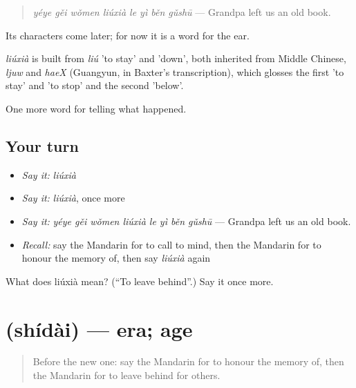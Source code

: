 \begin{quote}
\emph{yéye gěi wǒmen liúxià le yì běn gǔshū} — Grandpa left us an old book.
\end{quote}

Its characters come later; for now it is a word for the ear.

\begin{cousinweb}
\emph{liúxià} is built from \emph{liú} 'to stay' and  'down', both inherited from Middle Chinese, \emph{ljuw} and \emph{haeX} (Guangyun, in Baxter's transcription), which glosses the first 'to stay' and 'to stop' and the second 'below'.
\end{cousinweb}

\begin{grammarlens}[title={What you've built}]
One more word for telling what happened.
\end{grammarlens}

\subsection*{Your turn}
\begin{itemize}
\raggedright
  \item \emph{Say it:} \emph{liúxià}
  \item \emph{Say it:} \emph{liúxià}, once more
  \item \emph{Say it:} \emph{yéye gěi wǒmen liúxià le yì běn gǔshū} — Grandpa left us an old book.
  \item \emph{Recall:} say the Mandarin for to call to mind, then the Mandarin for to honour the memory of, then say \emph{liúxià} again
\end{itemize}

\begin{tcolorbox}[breakable,colback=teal!4,colframe=teal!35!black,title={Before you move on}]
What does liúxià mean? (\textquotedblleft{}To leave behind\textquotedblright{}.) Say it once more.
\end{tcolorbox}
\section[\texorpdfstring{\zh{时代} (shídài)}{时代 (shídài)}]{ (shídài) — era; age}

\label{lesson:ZH-C324-shidai}



\begin{quote}
Before the new one: say the Mandarin for to honour the memory of, then the Mandarin for to leave behind for others.
\end{quote}

